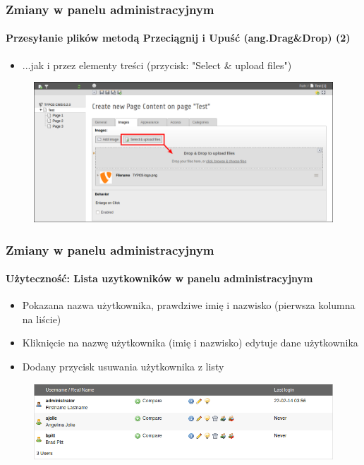 \begin{frame}[fragile]
	\frametitle{Zmiany w panelu administracyjnym}
	\framesubtitle{Przesyłanie plików metodą Przeciągnij i Upuść (ang.Drag\&Drop) (2)}

	\begin{itemize}
		\item ...jak i przez elementy treści (przycisk: "Select \& upload files")

	\end{itemize}

	\begin{figure}
		\includegraphics[width=0.95\linewidth]{Images/BackendChanges/SelectAndUploadFiles.png}
	\end{figure}

\end{frame}


\begin{frame}[fragile]
	\frametitle{Zmiany w panelu administracyjnym}
	\framesubtitle{Użyteczność: Lista uzytkowników w panelu administracyjnym}

	\begin{itemize}
		\item Pokazana nazwa użytkownika, prawdziwe imię i nazwisko (pierwsza kolumna na liście)
		\item Kliknięcie na nazwę użytkownika (imię i nazwisko) edytuje dane użytkownika
		\item Dodany przycisk usuwania użytkownika z listy

	\end{itemize}

	\begin{figure}
		\includegraphics[width=0.95\linewidth]{Images/BackendChanges/BackendUserList.png}
	\end{figure}

\end{frame}

